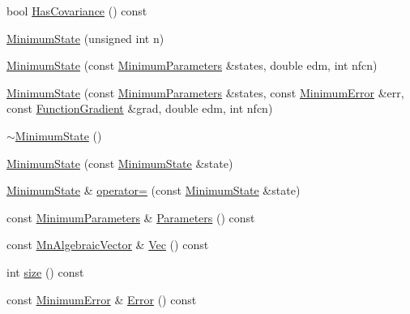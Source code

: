\begin{DoxyCompactItemize}
\item 
bool \mbox{\hyperlink{classROOT_1_1Minuit2_1_1MinimumState_aba1e55d52217a591657dba0cc9fa8c9c}{Has\+Covariance}} () const
\item 
\mbox{\hyperlink{classROOT_1_1Minuit2_1_1MinimumState_a47a98082c74eff4dc1fc1758078c27d6}{Minimum\+State}} (unsigned int n)
\item 
\mbox{\hyperlink{classROOT_1_1Minuit2_1_1MinimumState_a602211ccc0379969a079ebf4de44421b}{Minimum\+State}} (const \mbox{\hyperlink{classROOT_1_1Minuit2_1_1MinimumParameters}{Minimum\+Parameters}} \&states, double edm, int nfcn)
\item 
\mbox{\hyperlink{classROOT_1_1Minuit2_1_1MinimumState_a35c2e0098d60a9caeee9e2c60093b5a9}{Minimum\+State}} (const \mbox{\hyperlink{classROOT_1_1Minuit2_1_1MinimumParameters}{Minimum\+Parameters}} \&states, const \mbox{\hyperlink{classROOT_1_1Minuit2_1_1MinimumError}{Minimum\+Error}} \&err, const \mbox{\hyperlink{classROOT_1_1Minuit2_1_1FunctionGradient}{Function\+Gradient}} \&grad, double edm, int nfcn)
\item 
\mbox{\hyperlink{classROOT_1_1Minuit2_1_1MinimumState_a30666c7113d7e8c199d4de1b1a44ee03}{$\sim$\+Minimum\+State}} ()
\item 
\mbox{\hyperlink{classROOT_1_1Minuit2_1_1MinimumState_a7e5a25f631c74fffd8cfd14d2268600e}{Minimum\+State}} (const \mbox{\hyperlink{classROOT_1_1Minuit2_1_1MinimumState}{Minimum\+State}} \&state)
\item 
\mbox{\hyperlink{classROOT_1_1Minuit2_1_1MinimumState}{Minimum\+State}} \& \mbox{\hyperlink{classROOT_1_1Minuit2_1_1MinimumState_ad0d12f94b8f1adca2b2c4279006f82e4}{operator=}} (const \mbox{\hyperlink{classROOT_1_1Minuit2_1_1MinimumState}{Minimum\+State}} \&state)
\item 
const \mbox{\hyperlink{classROOT_1_1Minuit2_1_1MinimumParameters}{Minimum\+Parameters}} \& \mbox{\hyperlink{classROOT_1_1Minuit2_1_1MinimumState_aa81bb59c8eb8c262ef2487ca1b025481}{Parameters}} () const
\item 
const \mbox{\hyperlink{namespaceROOT_1_1Minuit2_a62ed97730a1ca8d3fbaec64a19aa11c9}{Mn\+Algebraic\+Vector}} \& \mbox{\hyperlink{classROOT_1_1Minuit2_1_1MinimumState_a0c7ad9c9226473f87b1bbb15ed87bbcd}{Vec}} () const
\item 
int \mbox{\hyperlink{classROOT_1_1Minuit2_1_1MinimumState_af680928a4485a4d0db0c81a8283d24bd}{size}} () const
\item 
const \mbox{\hyperlink{classROOT_1_1Minuit2_1_1MinimumError}{Minimum\+Error}} \& \mbox{\hyperlink{classROOT_1_1Minuit2_1_1MinimumState_a28d9bb6148e54a7bf4ca15ca9548fe23}{Error}} () const

\end{DoxyCompactItemize}

